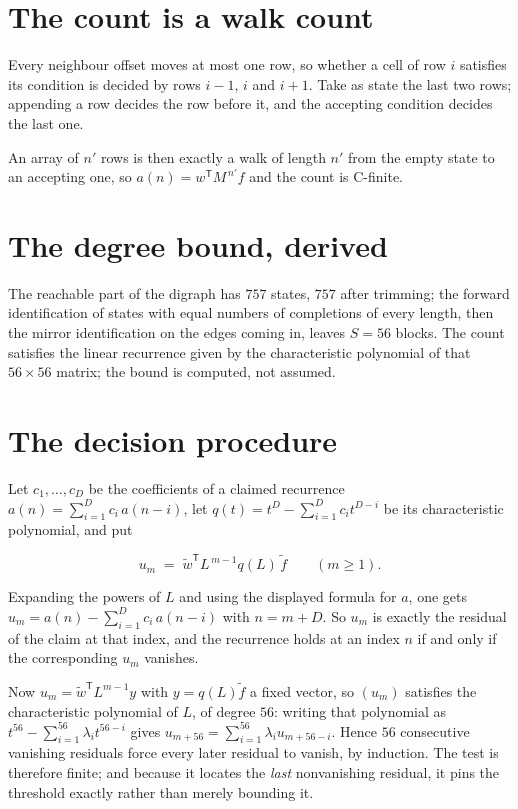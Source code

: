\documentclass[11pt]{article}
\theoremstyle{definition}
\begin{document}
\section{The count is a walk count}

Every neighbour offset moves at most one row, so whether a cell of row $i$ satisfies its condition is decided by rows $i-1$, $i$ and $i+1$. Take as state the last two rows; appending a row decides the row before it, and the accepting condition decides the last one.

An array of $n'$ rows is then exactly a walk of length $n'$ from the empty state to an accepting one, so $a(n) = w^{\mathsf T}M^{\,n'}f$ and the count is C-finite.

\section{The degree bound, derived}

The reachable part of the digraph has $757$ states, $757$ after trimming; the forward identification of states with equal numbers of completions of every length, then the mirror identification on the edges coming in, leaves $S = 56$ blocks. The count satisfies the linear recurrence given by the characteristic polynomial of that $56\times56$ matrix; the bound is computed, not assumed.

\section{The decision procedure}

Let $c_1,\dots,c_D$ be the coefficients of a claimed recurrence $a(n) = \sum_{i=1}^{D} c_i\,a(n-i)$, let $q(t) = t^{D} - \sum_{i=1}^{D} c_i t^{D-i}$ be its characteristic polynomial, and put

\[u_m \;=\; \tilde w^{\mathsf T} L^{\,m-1} q(L)\,\tilde f \qquad (m \ge 1).\]

Expanding the powers of $L$ and using the displayed formula for $a$, one gets $u_m = a(n) - \sum_{i=1}^{D} c_i\,a(n-i)$ with $n = m + D$. So $u_m$ is exactly the residual of the claim at that index, and the recurrence holds at an index $n$ if and only if the corresponding $u_m$ vanishes.

Now $u_m = \tilde w^{\mathsf T} L^{m-1} y$ with $y = q(L)\tilde f$ a fixed vector, so $(u_m)$ satisfies the characteristic polynomial of $L$, of degree $56$: writing that polynomial as $t^{56} - \sum_{i=1}^{56} \lambda_i t^{56-i}$ gives $u_{m+56} = \sum_{i=1}^{56} \lambda_i u_{m+56-i}$. Hence $56$ consecutive vanishing residuals force every later residual to vanish, by induction. The test is therefore finite; and because it locates the {\itshape last} nonvanishing residual, it pins the threshold exactly rather than merely bounding it.
\end{document}
